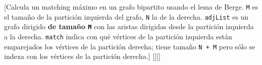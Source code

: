		[Calcula un matching máximo en un grafo bipartito usando el lema de Berge. \texttt{M} es el tamaño de la partición izquierda del grafo, \texttt{N} la de la derecha. \texttt{adjList} es un grafo dirigido \textbf{de tamaño \texttt{M}} con las aristas dirigidas desde la partición izquierda a la derecha. \texttt{match} indica con qué vértices de la partición izquierda están emparejados los vértices de la partición derecha; tiene tamaño \texttt{N + M} pero sólo se indexa con los vértices de la partición derecha.]%
		[][]

